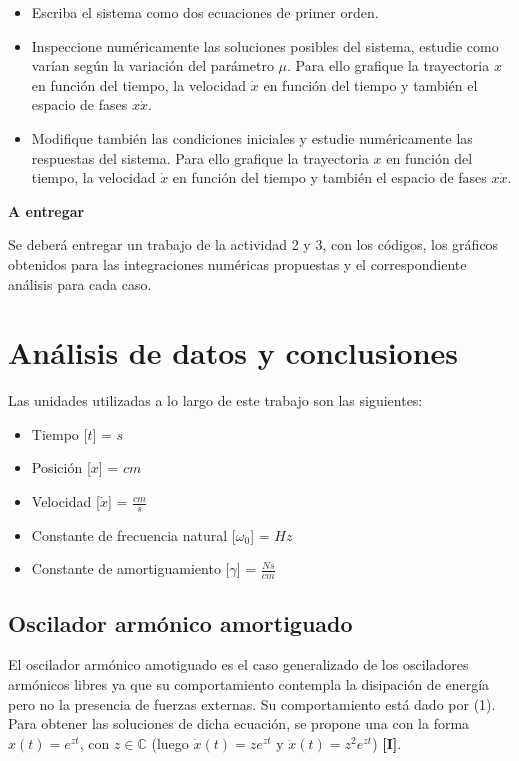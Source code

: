 \documentclass[a4paper,12pt]{article}
\begin{document}
\begin{itemize}
\item Escriba el sistema como dos ecuaciones de primer orden.
\item Inspeccione num\'ericamente las soluciones posibles del sistema, estudie como var\'ian seg\'un la variaci\'on del par\'ametro $\mu$. Para ello grafique la trayectoria $x$ en funci\'on del tiempo, la velocidad $\dot{x}$ en funci\'on del tiempo y tambi\'en el espacio de fases $x  \dot{x}$.
\item Modifique tambi\'en las condiciones iniciales y estudie num\'ericamente las respuestas del sistema. Para ello grafique la trayectoria $x$ en funci\'on del tiempo, la velocidad $\dot{x}$ en funci\'on del tiempo y tambi\'en el espacio de fases $x  \dot{x}$.
\end{itemize}


{\Large \textbf{A entregar}}

Se deber\'a entregar un trabajo de la actividad 2 y 3, con los c\'odigos, los gr\'aficos obtenidos para las integraciones num\'ericas propuestas y el correspondiente an\'alisis para cada caso.


\section{An\'alisis de datos y conclusiones}

Las unidades utilizadas a lo largo de este trabajo son las siguientes:

\begin{itemize}
\item Tiempo [$t$] = $s$
\item Posici\'on [$x$] = $cm$
\item Velocidad [$\dot{x}$] = $\frac{cm}{s}$
\item Constante de frecuencia natural [$\omega_0$] = $Hz$
\item Constante de amortiguamiento [$\gamma$] = $\frac{Ns}{cm}$
\end{itemize}

\subsection{Oscilador arm\'onico amortiguado}

El oscilador arm\'onico amotiguado es el caso generalizado de los osciladores arm\'onicos libres ya que su comportamiento contempla la disipaci\'on de energ\'ia pero no la presencia de fuerzas externas. Su comportamiento est\'a dado por (1).
Para obtener las soluciones de dicha ecuaci\'on, se propone una con la forma $x(t) = e^{zt}$, con $z \in \mathbb{C}$ (luego $\dot{x}(t) = ze^{zt}$ y $\ddot{x}(t) = z^2e^{zt}$) \textbf{[I]}.
\end{document}
